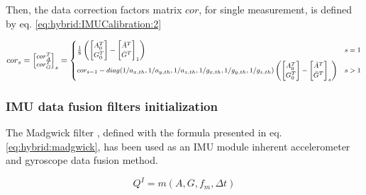 \documentclass[sensors,article,submit,moreauthors,pdftex,10pt,a4paper]{mdpi}
\begin{document}
Then, the data correction factors matrix $cor$, for single measurement, is defined by eq. \ref{eq:hybrid:IMUCalibration:2}
		
\begin{equation}
	\footnotesize
	cor_s = \begin{bmatrix}cor_A^T\\ cor_G^T\end{bmatrix}_s =
	\begin{cases}
		\frac{1}{8}\left(\begin{bmatrix}A_0^T                                                                          \\ G_0^T\end{bmatrix} - \begin{bmatrix}\bar{A}^T\\ \bar{G}^T\end{bmatrix}_1\right) & s = 1\\
		cor_{s-1} - diag(1/a_{x,th},1/a_{y,th},1/a_{z,th},1/g_{x,th},1/g_{y,th},1/g_{z,th}) \left(\begin{bmatrix}A_0^T \\ G_0^T\end{bmatrix} - \begin{bmatrix}\bar{A}^T\\ \bar{G}^T\end{bmatrix}_s\right) & s > 1
	\end{cases}
	\label{eq:hybrid:IMUCalibration:2}
\end{equation}	
		
\subsubsection{IMU data fusion filters initialization}
The Madgwick filter \cite{Madgwick2011}, defined with the formula presented in eq. \ref{eq:hybrid:madgwick}, has been used as an IMU module inherent accelerometer and gyroscope data fusion method. 
		
\begin{equation}
	Q^I=m(A,G,f_m,\Delta t)
	\label{eq:hybrid:madgwick}
\end{equation}
		
\end{document}
